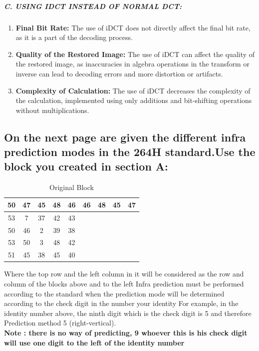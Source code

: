 \documentclass[letterpaper, 12pt]{article}
\begin{document}
\subparagraph{C. USING IDCT INSTEAD OF NORMAL DCT:}

\begin{enumerate}
    \item \textbf{Final Bit Rate:} The use of iDCT does not directly affect the final bit rate, as it is a part of the decoding process. 
    \item \textbf{Quality of the Restored Image:} The use of iDCT can affect the quality of the restored image, as inaccuracies in algebra operations in the transform or inverse can lead to decoding errors and more distortion or artifacts.
    \item \textbf{Complexity of Calculation:} The use of iDCT decreases the complexity of the calculation, implemented using only additions and 
bit-shifting operations without multiplications.
\end{enumerate}


\subsection{On the next page are given the different infra prediction modes in the 264H standard.Use the block you created in section A:}
\begin{table}[htbp]
    \centering
    \caption{Original Block}
    \begin{tabular}{|c|c|c|c|c|c|c|c|c|} \hline 
         50&  47&  45&  48&  46&  46&  48&  45& 47\\ \hline 
         53&  7&  37&  42&  43&  &  &  & \\ \hline 
         50&  46&  2&  39&  38&  &  &  & \\ \hline 
         53&  50&  3&  48&  42&  &  &  & \\ \hline 
         51&  45&  38&  45&  40&  &  &  & \\ \hline
    \end{tabular}
\end{table}

Where the top row and the left column in it will be considered as the row and column of the blocks above and to the left Infra prediction must be performed according to the standard when the prediction mode will be determined according to the check digit in the number your identity For example, in the identity number above, the ninth digit which is the check digit is 5 and therefore Prediction method 5 (right-vertical).\\

\textbf{Note : there is no way of predicting, 9 whoever this is his check digit will use one digit to the left of the identity number}\\
\end{document}
